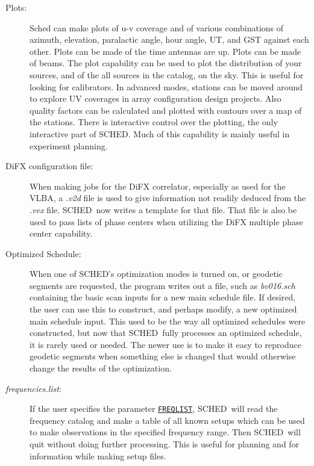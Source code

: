 \documentclass{report}
\newcommand{\sched}{{\sc SCHED}}
\newcommand{\schedb}{{\sc SCHED~}}
\begin{document}
\begin{description}
\item[Plots:] Sched can make plots of u-v coverage and of various
combinations of azimuth, elevation, paralactic angle, hour angle, UT,
and GST against each other.  Plots can be made of the time antennas
are up.  Plots can be made of beams.  The plot capability can be used
to plot the distribution of your sources, and of the all sources in
the catalog, on the sky.  This is useful for looking for calibrators.
In advanced modes, stations can be moved around to explore UV
coverages in array configuration design projects.  Also quality
factors can be calculated and plotted with contours over a map of the
stations.  There is interactive control over the plotting, the only
interactive part of SCHED.  Much of this capability is mainly useful
in experiment planning.

\item[DiFX configuration file:]  When making jobs for the DiFX
correlator, especially as used for the VLBA, a {\sl .v2d} file is
used to give information not readily deduced from the {\sl .vex}
file.  \schedb now writes a template for that file.  That file is
also be used to pass lists of phase centers when utilizing the DiFX
multiple phase center capability.

\item[Optimized Schedule:] When one of \sched's optimization modes is
turned on, or geodetic segments are requested, the program writes out
a file, such as {\sl bv016.sch} containing the basic scan inputs for a
new main schedule file.  If desired, the user can use this to
construct, and perhaps modify, a new optimized main schedule input.
This used to be the way all optimized schedules were constructed, but
now that \schedb fully processes an optimized schedule, it is rarely
used or needed.  The newer use is to make it easy to reproduce
geodetic segments when something else is changed that would otherwise
change the results of the optimization.

\item[{\sl frequencies.list}:]  If the user specifies the parameter
{\hyperref[MP:FREQLIST]{{\tt FREQLIST}}}, \schedb will read the
frequency catalog and make a table of all known setups which can
be used to make observations in the specified frequency range.  Then
\schedb will quit without doing further processing.  This is useful
for planning and for information while making setup files.

\end{description}
\end{document}
